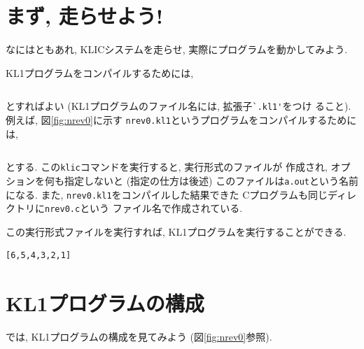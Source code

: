 \documentclass[a4,titlepage]{jsreport}
\begin{document}
\section{まず, 走らせよう!}
なにはともあれ, KLICシステムを走らせ, 実際にプログラムを動かしてみよう.  

KL1プログラムをコンパイルするためには, 

\begin{Verbatim}[frame=single]
% klic `KL1プログラムのファイル名'
\end{Verbatim}
とすればよい (KL1プログラムのファイル名には, 拡張子\verb|`.kl1'|をつけ
ること).
例えば, 図\ref{fig:nrev0}に示す
\verb|nrev0.kl1|というプログラムをコンパイルするためには, 

\begin{Verbatim}[frame=single]
% klic nrev0.kl1
\end{Verbatim}
とする.  この\verb|klic|コマンドを実行すると, 実行形式のファイルが
作成され, オプションを何も指定しないと (指定の仕方は後述) 
このファイルは\verb|a.out|という名前になる.  
また, \verb|nrev0.kl1|をコンパイルした結果できた
Cプログラムも同じディレクトリに\verb|nrev0.c|という
ファイル名で作成されている.  

この実行形式ファイルを実行すれば, KL1プログラムを実行することができる.  
\begin{Verbatim}[frame=single]
% a.out
[6,5,4,3,2,1]
\end{Verbatim}

\section{KL1プログラムの構成}
では, KL1プログラムの構成を見てみよう (図\ref{fig:nrev0}参照).
\end{document}
